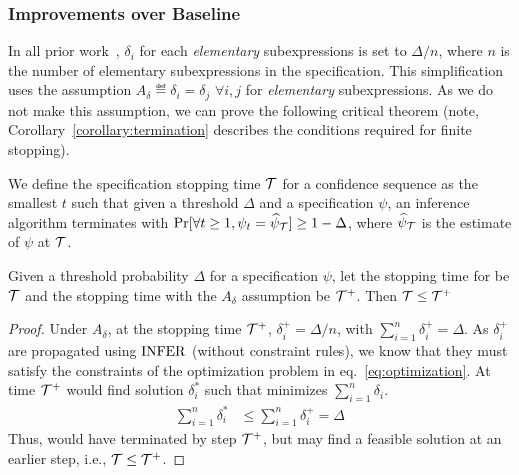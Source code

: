 \subsubsection{Improvements over Baseline}
In all prior work~\citep{albarghouthi2017fairsquare,albarghouthi2019fairness,bastani2019probabilistic}, $\delta_i$ for each \textit{elementary} subexpressions is set to $\Delta/n$, where $n$ is the number of elementary subexpressions in the specification.
This simplification uses the assumption $A_\delta \eqdef \delta_i = \delta_j$ $\forall i, j$ for \textit{elementary} subexpressions.
As we do not make this assumption, we can prove the following critical theorem (note, Corollary~\ref{corollary:termination} describes the conditions required for finite stopping).

\begin{definition}
We define the specification stopping time ${\mathcal{T}}$ for a confidence sequence as the smallest $t$ such that given a threshold $\Delta$ and a specification $\psi$, an inference algorithm terminates with $\Pr[\forall t \geq 1, \psi_t = \widehat{\psi}_{\mathcal{T}}] \geq 1 - \Delta$, where $\widehat{\psi}_{{\mathcal{T}}}$ is the estimate of $\psi$ at ${\mathcal{T}}$.
\end{definition}

\begin{theorem}
\label{theorem:better-stopping}
Given a threshold probability $\Delta$ for a specification $\psi$, let the stopping time for \AVOIRmethodname{} be ${\mathcal{T}}$ and the stopping time with the $A_\delta$ assumption be ${\mathcal{T}}^+$. Then ${\mathcal{T}} \leq {\mathcal{T}}^+$
\end{theorem}
\begin{proof}
Under $A_\delta$, at the stopping time ${\mathcal{T}}^+$,  $\delta^+_i = \Delta/n$, with 
$\sum\limits_{i=1}^{n} \delta^+_i = \Delta$.
As $\delta_i^+$ are propagated using $\rm{INFER}$ (without constraint rules),
we know that they must satisfy the constraints of the optimization problem in  eq.~\ref{eq:optimization}. 
At time ${\mathcal{T}}^+$ \AVOIRmethodname{} would find solution $\delta^*_i$ such that minimizes $\sum\limits_{i=1}^{n} \delta_i$.
\begin{align*}
    \sum\limits_{i=1}^{n} \delta^*_i &\leq \sum\limits_{i=1}^{n} \delta^+_i 
                                     = \Delta
\end{align*}
Thus, \AVOIRmethodname{} would have terminated by step ${\mathcal{T}}^+$, but may find a feasible solution at an earlier step, i.e., ${\mathcal{T}} \leq {\mathcal{T}}^+$.
\end{proof}

